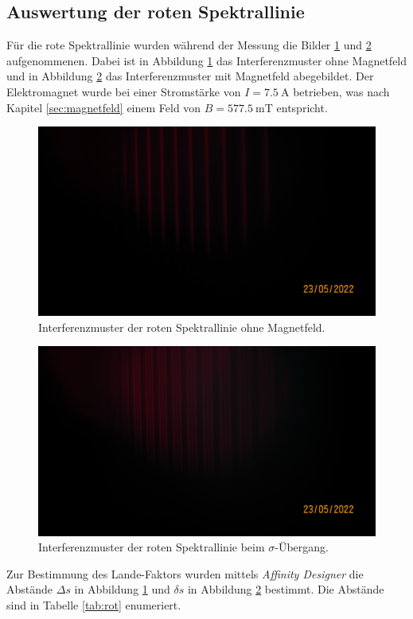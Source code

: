 \subsection{Auswertung der roten Spektrallinie}
\label{sec:rot}
Für die rote Spektrallinie wurden während der Messung die Bilder \ref{fig:rot} und \ref{fig:rot_sigma} 
aufgenommenen. Dabei ist in Abbildung \ref{fig:rot} das Interferenzmuster ohne Magnetfeld und in 
Abbildung \ref{fig:rot_sigma} das Interferenzmuster mit Magnetfeld abegebildet. Der Elektromagnet wurde 
bei einer Stromstärke von $I=\SI{7.5}{\ampere}$ betrieben, was nach Kapitel \ref{sec:magnetfeld} einem 
Feld von $B=\SI{577.5}{\milli\tesla}$ entspricht.

\begin{figure}[H]
    \centering
    \includegraphics[scale= 0.2]{Messung/Rot[6].JPG}
    \caption{Interferenzmuster der roten Spektrallinie ohne Magnetfeld.}
    \label{fig:rot}
\end{figure}
\noindent

\begin{figure}[H]
    \centering
    \includegraphics[scale= 0.2]{Messung/Rot_Sigma[7].JPG}
    \caption{Interferenzmuster der roten Spektrallinie beim $\sigma$-Übergang.}
    \label{fig:rot_sigma}
\end{figure}
\noindent
Zur Bestimmung des Lande-Faktors wurden mittels \textit{Affinity Designer} \cite{affinity} die Abstände $\Delta s$ 
in Abbildung \ref{fig:rot} und $\delta s$ in Abbildung \ref{fig:rot_sigma} bestimmt. Die Abstände sind in 
Tabelle \ref{tab:rot} enumeriert.


